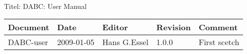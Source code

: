 \\Titel: DABC: User Manual
\begin{table}[h]
\begin{tabular}{|p{2.8cm}|p{2.0cm}|p{3.0cm}|p{1.6cm}|p{5.0cm}|} \hline
Document   & Date        & Editor       & Revision & Comment \\
\hline DABC-user & 2009-01-05 & Hans G.Essel & 1.0.0      &
First scetch \\ \hline
\end{tabular}
\end{table}
